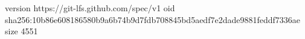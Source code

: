version https://git-lfs.github.com/spec/v1
oid sha256:10b86e608186580b9a6b74b9d7fdb708845bd5aedf7e2dade9881feddf7336ae
size 4551
